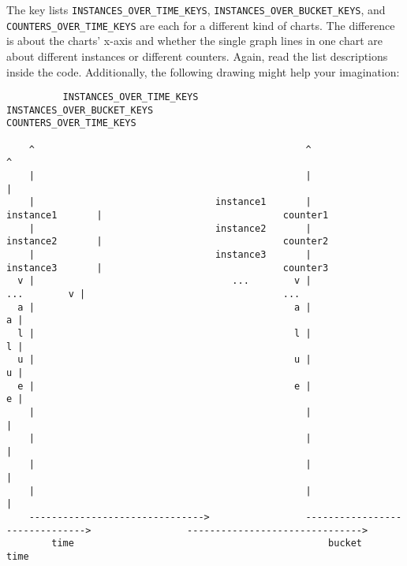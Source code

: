 \documentclass[a4paper,11pt]{article}
\begin{document}
The key lists \verb|INSTANCES_OVER_TIME_KEYS|, \verb|INSTANCES_OVER_BUCKET_KEYS|, and \verb|COUNTERS_|\break\verb|OVER_TIME_KEYS| are each for a different kind of charts. The difference is about the charts' x-axis and whether the single graph lines in one chart are about different instances or different counters. Again, read the list descriptions inside the code. Additionally, the following drawing might help your imagination:

\begin{lstlisting}
          INSTANCES_OVER_TIME_KEYS                         INSTANCES_OVER_BUCKET_KEYS                        COUNTERS_OVER_TIME_KEYS

    ^                                                ^                                                ^                                                         
    |                                                |                                                |                                                         
    |                                instance1       |                                instance1       |                                counter1                
    |                                instance2       |                                instance2       |                                counter2                
    |                                instance3       |                                instance3       |                                counter3                
  v |                                   ...        v |                                   ...        v |                                   ...                   
  a |                                              a |                                              a |                                                         
  l |                                              l |                                              l |                                                         
  u |                                              u |                                              u |                                                         
  e |                                              e |                                              e |                                                         
    |                                                |                                                |                                                         
    |                                                |                                                |                                                         
    |                                                |                                                |                                                         
    |                                                |                                                |                                                         
    ------------------------------->                 ------------------------------->                 ------------------------------->                          
        time                                             bucket                                           time                                                  
\end{lstlisting}
\end{document}
